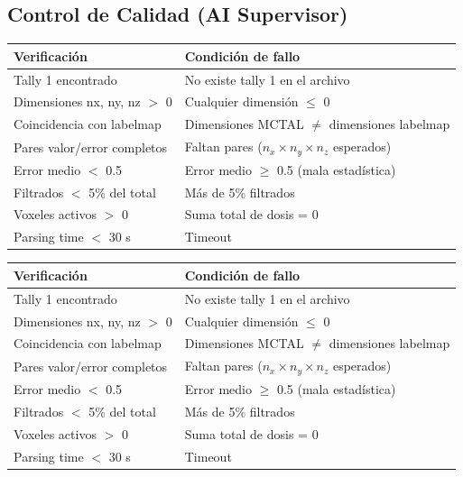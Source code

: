 \documentclass[12pt,a4paper]{article}
\begin{document}
\begin{tcolorbox}[aiSupervisor]
\subsection*{Control de Calidad (AI Supervisor)}

\begin{tabular}{p{5cm} p{10cm}}
\toprule
\textbf{Verificación} & \textbf{Condición de fallo} \\
\midrule
Tally 1 encontrado & No existe tally 1 en el archivo \\
Dimensiones nx, ny, nz $>$ 0 & Cualquier dimensión $\leq$ 0 \\
Coincidencia con labelmap & Dimensiones MCTAL $\neq$ dimensiones labelmap \\
Pares valor/error completos & Faltan pares ($n_x \times n_y \times n_z$ esperados) \\
Error medio $<$ 0.5 & Error medio $\geq$ 0.5 (mala estadística) \\
Filtrados $<$ 5\% del total & Más de 5\% filtrados \\
Voxeles activos $>$ 0 & Suma total de dosis = 0 \\
Parsing time $<$ 30 s & Timeout \\
\bottomrule
\end{tabular}

\newpage




\begin{tabular}{p{5cm} p{10cm}}
\toprule
\textbf{Verificación} & \textbf{Condición de fallo} \\
\midrule
Tally 1 encontrado & No existe tally 1 en el archivo \\
Dimensiones nx, ny, nz $>$ 0 & Cualquier dimensión $\leq$ 0 \\
Coincidencia con labelmap & Dimensiones MCTAL $\neq$ dimensiones labelmap \\
Pares valor/error completos & Faltan pares ($n_x \times n_y \times n_z$ esperados) \\
Error medio $<$ 0.5 & Error medio $\geq$ 0.5 (mala estadística) \\
Filtrados $<$ 5\% del total & Más de 5\% filtrados \\
Voxeles activos $>$ 0 & Suma total de dosis = 0 \\
Parsing time $<$ 30 s & Timeout \\
\bottomrule
\end{tabular}

\newpage

\end{tcolorbox}
\end{document}
